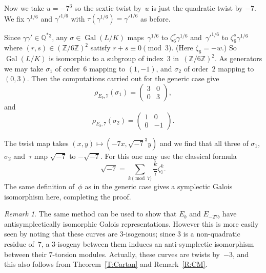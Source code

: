 \documentclass[12pt]{amsart}
\newcommand{\Q}{\mathbb{Q}}
\newcommand{\Z}{\mathbb{Z}}
\DeclareMathOperator{\Gal}{Gal}
\def\r3{\sqrt{-3}}
\def\legendre#1#2{\displaystyle{\frac{#1}{#2}}}
\numberwithin{equation}{section}
\theoremstyle{definition}
\theoremstyle{remark}
\newtheorem{remark}[theorem]{Remark}
\begin{document}
Now we take $u=-7^3$ so the sextic twist by~$u$ is just the quadratic
twist by $-7$.  We fix $\gamma^{1/6}$ and $\gamma'^{1/6}$ with
$\tau(\gamma^{1/6})=\gamma'^{1/6}$ as before.

Since $\gamma\gamma'\in\Q^*{}^3$, any $\sigma\in\Gal(L/K)$
maps~$\gamma^{1/6}$ to $\zeta_6^r\gamma^{1/6}$ and~$\gamma'^{1/6}$ to
$\zeta_6^s\gamma^{1/6}$ where $(r,s)\in(\Z/6\Z)^2$ satisfy
$r+s\equiv0\pmod3$.  (Here $\zeta_6=-w$.) So $\Gal(L/K)$ is isomorphic
to a subgroup of index~$3$ in~$(\Z/6\Z)^2$.  As generators we may take
$\sigma_1$ of order~$6$ mapping to $(1,-1)$, and $\sigma_2$ of
order~$2$ mapping to $(0,3)$.  Then the computations carried out for
the generic case give
\[
   \rho_{E_b,7}(\sigma_1) = \begin{pmatrix}3&0\\0&3   \end{pmatrix},
\]
and
\[
   \rho_{E_b,7}(\sigma_2) = \begin{pmatrix}1&0\\0&-1   \end{pmatrix}.
\]

The twist map takes $(x,y)\mapsto(-7x,\sqrt{-7}^3y)$ and we find that
all three of $\sigma_1$, $\sigma_2$ and~$\tau$ map $\sqrt{-7}$ to
$-\sqrt{-7}$.  For this one may use the classical formula
\[
   \sqrt{-7} = \sum_{k\pmod7}\legendre{k}{7}\zeta_7^k.
\]
The same definition of~$\phi$ as in the generic case gives a
symplectic Galois isomorphism here, completing the proof.

\begin{remark}
The same method can be used to show that $E_b$ and $E_{-27b}$ have
antisymplectically isomorphic Galois representations.  However this is
more easily seen by noting that these curves are $3$-isogenous; since
$3$ is a non-quadratic residue of~$7$, a $3$-isogeny between them
induces an anti-symplectic isomorphism between their $7$-torsion modules. Actually, these curves 
are twists by~$-3$, and this also follows 
from Theorem~\ref{T:Cartan} and Remark~\ref{R:CM}. 
\end{remark}

\end{document}
